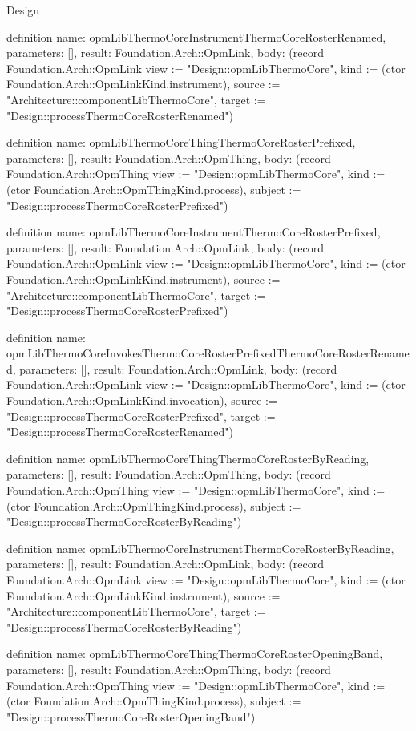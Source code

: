 \begin{lexlean}{Design}
\begin{semanticmodule}
definition{
  name: opmLibThermoCoreInstrumentThermoCoreRosterRenamed,
  parameters: [],
  result: Foundation.Arch::OpmLink,
  body: (record Foundation.Arch::OpmLink {view := "Design::opmLibThermoCore", kind := (ctor Foundation.Arch::OpmLinkKind.instrument), source := "Architecture::componentLibThermoCore", target := "Design::processThermoCoreRosterRenamed"})
}

definition{
  name: opmLibThermoCoreThingThermoCoreRosterPrefixed,
  parameters: [],
  result: Foundation.Arch::OpmThing,
  body: (record Foundation.Arch::OpmThing {view := "Design::opmLibThermoCore", kind := (ctor Foundation.Arch::OpmThingKind.process), subject := "Design::processThermoCoreRosterPrefixed"})
}

definition{
  name: opmLibThermoCoreInstrumentThermoCoreRosterPrefixed,
  parameters: [],
  result: Foundation.Arch::OpmLink,
  body: (record Foundation.Arch::OpmLink {view := "Design::opmLibThermoCore", kind := (ctor Foundation.Arch::OpmLinkKind.instrument), source := "Architecture::componentLibThermoCore", target := "Design::processThermoCoreRosterPrefixed"})
}

definition{
  name: opmLibThermoCoreInvokesThermoCoreRosterPrefixedThermoCoreRosterRenamed,
  parameters: [],
  result: Foundation.Arch::OpmLink,
  body: (record Foundation.Arch::OpmLink {view := "Design::opmLibThermoCore", kind := (ctor Foundation.Arch::OpmLinkKind.invocation), source := "Design::processThermoCoreRosterPrefixed", target := "Design::processThermoCoreRosterRenamed"})
}

definition{
  name: opmLibThermoCoreThingThermoCoreRosterByReading,
  parameters: [],
  result: Foundation.Arch::OpmThing,
  body: (record Foundation.Arch::OpmThing {view := "Design::opmLibThermoCore", kind := (ctor Foundation.Arch::OpmThingKind.process), subject := "Design::processThermoCoreRosterByReading"})
}

definition{
  name: opmLibThermoCoreInstrumentThermoCoreRosterByReading,
  parameters: [],
  result: Foundation.Arch::OpmLink,
  body: (record Foundation.Arch::OpmLink {view := "Design::opmLibThermoCore", kind := (ctor Foundation.Arch::OpmLinkKind.instrument), source := "Architecture::componentLibThermoCore", target := "Design::processThermoCoreRosterByReading"})
}

definition{
  name: opmLibThermoCoreThingThermoCoreRosterOpeningBand,
  parameters: [],
  result: Foundation.Arch::OpmThing,
  body: (record Foundation.Arch::OpmThing {view := "Design::opmLibThermoCore", kind := (ctor Foundation.Arch::OpmThingKind.process), subject := "Design::processThermoCoreRosterOpeningBand"})
}


\end{semanticmodule}
\end{lexlean}
